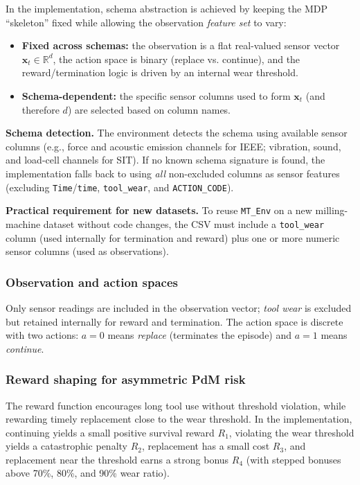 \documentclass[sn-basic]{sn-jnl} %
\begin{document}
In the implementation, schema abstraction is achieved by keeping the MDP ``skeleton'' fixed while allowing the observation \emph{feature set} to vary:
\begin{itemize}
        \item \textbf{Fixed across schemas:} the observation is a flat real-valued sensor vector $\mathbf{x}_t\in\mathbb{R}^d$, the action space is binary (replace vs. continue), and the reward/termination logic is driven by an internal wear threshold.
        \item \textbf{Schema-dependent:} the specific sensor columns used to form $\mathbf{x}_t$ (and therefore $d$) are selected based on column names.
\end{itemize}

\textbf{Schema detection.}
The environment detects the schema using available sensor columns (e.g., force and acoustic emission channels for IEEE; vibration, sound, and load-cell channels for SIT). If no known schema signature is found, the implementation falls back to using \emph{all} non-excluded columns as sensor features (excluding \texttt{Time}/\texttt{time}, \texttt{tool\_wear}, and \texttt{ACTION\_CODE}).

\textbf{Practical requirement for new datasets.}
To reuse \texttt{MT\_Env} on a new milling-machine dataset without code changes, the CSV must include a \texttt{tool\_wear} column (used internally for termination and reward) plus one or more numeric sensor columns (used as observations).

\subsubsection{Observation and action spaces}
Only sensor readings are included in the observation vector; \emph{tool wear} is excluded but retained internally for reward and termination. The action space is discrete with two actions: $a=0$ means \emph{replace} (terminates the episode) and $a=1$ means \emph{continue}.

\subsubsection{Reward shaping for asymmetric PdM risk}
\label{sec:reward}
The reward function encourages long tool use without threshold violation, while rewarding timely replacement close to the wear threshold. In the implementation, continuing yields a small positive survival reward $R_1$, violating the wear threshold yields a catastrophic penalty $R_2$, replacement has a small cost $R_3$, and replacement near the threshold earns a strong bonus $R_4$ (with stepped bonuses above 70\%, 80\%, and 90\% wear ratio).
\end{document}
